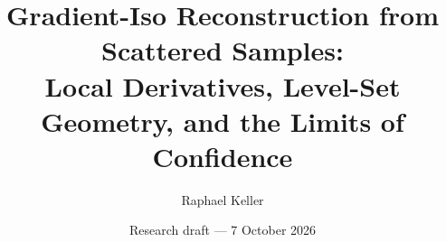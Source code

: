 \title{Gradient-Iso Reconstruction from Scattered Samples:\\
Local Derivatives, Level-Set Geometry, and the Limits of Confidence}
\author{Raphael Keller}
\date{Research draft --- 7 October 2026}
\newcommand{\PaperAbstract}{%
Sparse scalar measurements can reveal local improvement directions without
a global surrogate. We develop affine interpolation on Delaunay simplices,
explain how geometry controls derivative error, and recursively lift the
derivative cloud to higher orders. A Python implementation reuses the VICE
\texttt{EdgeIntersector} and retains source-simplex provenance. Exact affine
tests, noise propagation, quadratic refinement, recursive curvature, and
synthetic contamination checks separate algebraic correctness from
statistical reliability. Clean first derivatives improve with refinement,
whereas fixed measurement noise is amplified. Recursive second derivatives
are not automatically symmetric or polynomial preserving. The historical
iso-density confidence interpretation fails an affine counterexample and
performs poorly as a low-score anomaly ranking in the reported experiments.
We retain iso coverage as a geometric descriptor, expose undefined plateau
cases, and re-evaluate proposed search steps using the true synthetic
objective. This yields a reproducible research method with explicit
assumptions and limitations.}
\newif\ifshowglossary
\showglossarytrue
\newif\ifshowbibliography
\showbibliographytrue

